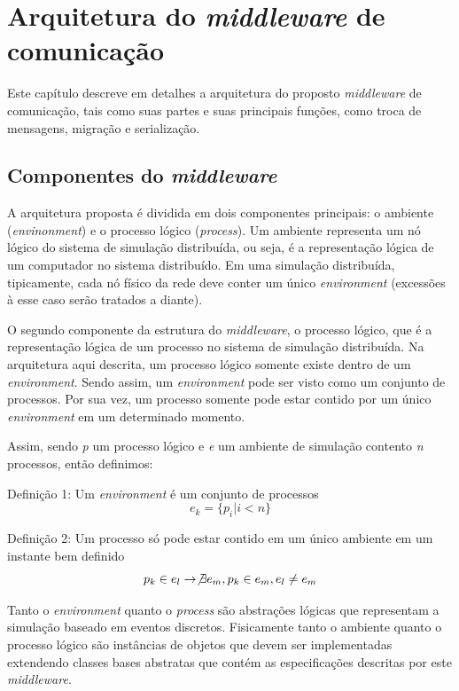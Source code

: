\chapter{Arquitetura do \textit{middleware} de comunicação}

Este capítulo descreve em detalhes a arquitetura do proposto \textit{middleware} de comunicação, tais como suas partes e suas principais funções, como troca de mensagens, migração e serialização. 

\section{Componentes do \textit{middleware}}

A arquitetura proposta é dividida em dois componentes principais: o ambiente (\textit{envinonment}) e o processo lógico (\textit{process}). Um ambiente representa um nó lógico do sistema de simulação distribuída, ou seja, é a representação lógica de um computador no sistema distribuído. Em uma simulação distribuída, tipicamente, cada nó físico da rede deve conter um único \textit{environment} (excessões à esse caso serão tratados a diante).

O segundo componente da estrutura do \textit{middleware}, o processo lógico, que é a representação lógica de um processo no sistema de simulação distribuída. Na arquitetura aqui descrita, um processo lógico somente existe dentro de um \textit{environment}. Sendo assim, um \textit{environment} pode ser visto como um conjunto de processos. Por sua vez, um processo somente pode estar contido por um único \textit{environment} em um determinado momento.

Assim, sendo \textit{p} um processo lógico e \textit{e} um ambiente de simulação contento \textit{n} processos, então definimos:

Definição 1: Um \textit{environment} é um conjunto de processos \begin{equation} e_{k} = \{p_{i} | i < n \} \end{equation}

Definição 2: Um processo só pode estar contido em um único ambiente em um instante bem definido \begin{equation} p_{k} \in e_{l} \rightarrow \not \exists e_{m}, p_{k} \in e_{m}, e_{l} \neq e_{m} \end{equation} 

Tanto o \textit{environment} quanto o \textit{process} são abstrações lógicas que representam a simulação baseado em eventos discretos. Fisicamente tanto o ambiente quanto o processo lógico são instâncias de objetos que devem ser implementadas extendendo classes bases abstratas que contém as especificações descritas por este \textit{middleware}.

